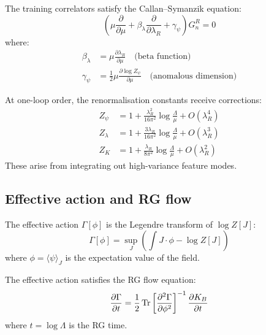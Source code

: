 \begin{theorem}
\label{thm:callan_symanzik_training}
The training correlators satisfy the Callan--Symanzik equation:
\begin{equation}
  \left(\mu \frac{\partial}{\partial \mu} + \beta_\lambda \frac{\partial}{\partial \lambda_R} + \gamma_\psi \right) G_n^R = 0
  \label{eq:callan_symanzik}
\end{equation}
where:
\begin{align}
  \beta_\lambda &= \mu \frac{\partial \lambda_R}{\partial \mu} \quad \text{(beta function)} \\
  \gamma_\psi &= \frac{1}{2} \mu \frac{\partial \log Z_\psi}{\partial \mu} \quad \text{(anomalous dimension)}
\end{align}
\end{theorem}

\begin{proposition}
\label{prop:one_loop_corrections}
At one-loop order, the renormalisation constants receive corrections:
\begin{align}
  Z_\psi &= 1 + \frac{\lambda_R^2}{16\pi^2} \log \frac{\Lambda}{\mu} + O(\lambda_R^4) \\
  Z_\lambda &= 1 + \frac{3\lambda_R}{16\pi^2} \log \frac{\Lambda}{\mu} + O(\lambda_R^3) \\
  Z_K &= 1 + \frac{\lambda_R}{8\pi^2} \log \frac{\Lambda}{\mu} + O(\lambda_R^2)
\end{align}
These arise from integrating out high-variance feature modes.
\end{proposition}

\subsection{Effective action and RG flow}

\begin{definition}
\label{def:effective_action_training}
The effective action $\Gamma[\phi]$ is the Legendre transform of $\log Z[J]$:
\begin{equation}
  \Gamma[\phi] = \sup_J \left( \int J \cdot \phi - \log Z[J] \right)
  \label{eq:effective_action}
\end{equation}
where $\phi = \langle \psi \rangle_J$ is the expectation value of the field.
\end{definition}

\begin{theorem}
\label{thm:rg_flow_training}
The effective action satisfies the RG flow equation:
\begin{equation}
  \frac{\partial \Gamma}{\partial t} = \frac{1}{2} \Tr \left[ \frac{\partial^2 \Gamma}{\partial \phi^2} \right]^{-1} \frac{\partial K_B}{\partial t}
  \label{eq:rg_flow}
\end{equation}
where $t = \log \Lambda$ is the RG time.
\end{theorem}


